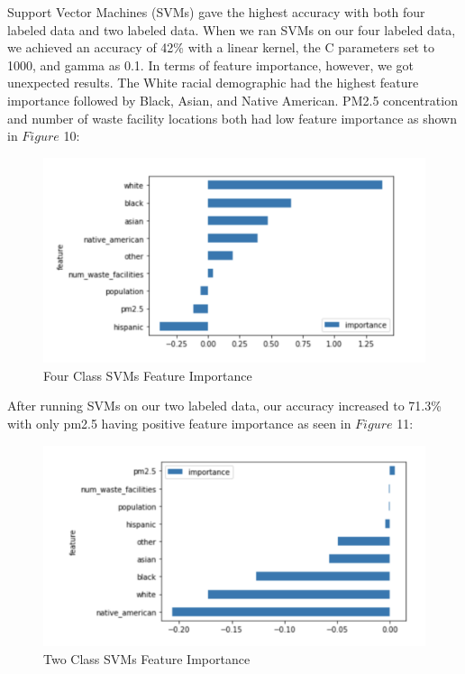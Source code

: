 \documentclass{article}
\begin{document}
Support Vector Machines (SVMs) gave the highest accuracy with both four labeled data and two labeled data. When we ran SVMs on our four labeled data, we achieved an accuracy of 42\% with a linear kernel, the C parameters set to 1000, and gamma as 0.1. In terms of feature importance, however, we got unexpected results. The White racial demographic had the highest feature importance followed by Black, Asian, and Native American. PM2.5 concentration and number of waste facility locations both had low feature importance as shown in $Figure$ 10: 

\begin{figure}[h]
\caption{Four Class SVMs Feature Importance}
\includegraphics[scale=0.45]{4ClassSVM.png}
\end{figure}

After running SVMs on our two labeled data, our accuracy increased to 71.3\% with only pm2.5 having positive feature importance as seen in $Figure$ 11: 

\begin{figure}[h]
\caption{Two Class SVMs Feature Importance}
\includegraphics[scale=0.45]{2ClassSVM.png}
\end{figure} 
\end{document}
